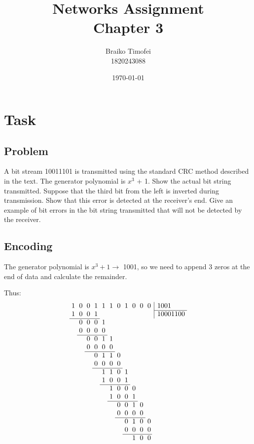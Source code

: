 \documentclass[12pt]{article}
\title{Networks Assignment\\ Chapter 3}
\author{Braiko Timofei\\1820243088}
\date{\today}
\begin{document}
    \section{Task}\label{sec:task-1}

    \subsection{Problem}
        A bit stream 10011101 is transmitted using the standard CRC method described in the text.
        The generator polynomial is $x^3$ + 1.
        Show the actual bit string transmitted.
        Suppose that the third bit from the left is inverted during transmission.
        Show that this error is detected at the receiver’s end.
        Give an example of bit errors in the bit string transmitted that will not be
        detected by the receiver.

        \subsection{Encoding}

        The generator polynomial is $x^3+1 \longrightarrow$ 1001,
        so we need to append 3 zeros at the end of data and calculate the remainder.

        Thus:
        \[\arraycolsep=0.3em
        \begin{array}{rrrrrrrrrrr@{\,}r|l}
            1 & 0 & 0 & 1 & 1 & 1 & 0 & 1 & 0 & 0 & 0 & & \,1001 \\
            \cline{13-10}
            1 & 0 & 0 & 1 &   &   &   &   &   &   &   & & \,10001100     \\
            \cline{1-4}
            & 0 & 0 & 0 & 1 \\
            & 0 & 0 & 0 & 0 \\
            \cline{2-5}
            & & 0 & 0 & 1 & 1 \\
            & & 0 & 0 & 0 & 0 \\
            \cline{3-6}
            & & & 0 & 1 & 1 & 0 \\
            & & & 0 & 0 & 0 & 0 \\
            \cline{4-7}
            & & & & 1 & 1 & 0 & 1 \\
            & & & & 1 & 0 & 0 & 1 \\
            \cline{5-8}
            & & & & & 1 & 0 & 0 & 0 \\
            & & & & & 1 & 0 & 0 & 1 \\
            \cline{6-9}
            & & & & & & 0 & 0 & 1 & 0 \\
            & & & & & & 0 & 0 & 0 & 0 \\
            \cline{7-10}
            & & & & & & & 0 & 1 & 0 & 0 \\
            & & & & & & & 0 & 0 & 0 & 0 \\
            \cline{8-11}
            & & & & & & & & 1 & 0 & 0
        \end{array} \]
\end{document}
